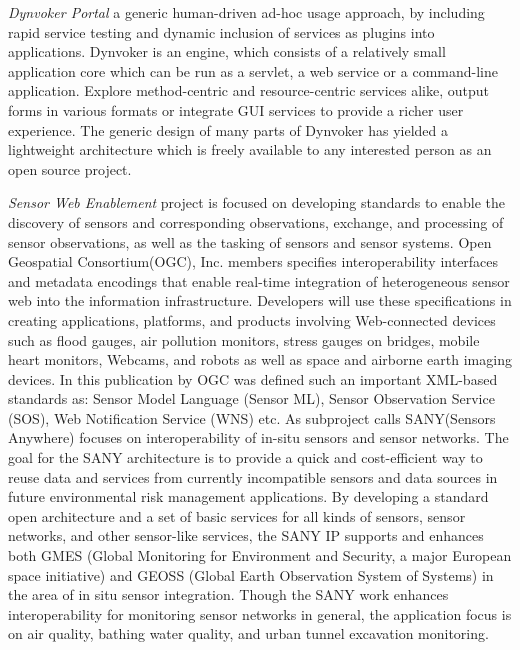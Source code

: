 	\emph{Dynvoker Portal}\cite{spillner2008ad} a generic human-driven ad-hoc usage approach, by including rapid service testing and dynamic inclusion of services as plugins into applications. Dynvoker is an engine, which consists of a relatively small application core which can be run as a servlet, a web service or a command-line application. Explore method-centric and resource-centric services alike, output forms in various formats or integrate GUI services to provide a richer user experience. The generic design of many parts of Dynvoker has yielded a lightweight architecture which is freely available to any interested person as an open source project.

	\emph{Sensor Web Enablement} project\cite{ogc} is focused on developing standards to enable the discovery of sensors and corresponding observations, exchange, and processing of sensor observations, as well as the tasking of sensors and sensor systems. Open Geospatial Consortium(OGC), Inc. members specifies interoperability interfaces and metadata encodings that enable real-time integration of heterogeneous sensor web into the information infrastructure. Developers will use these specifications in creating applications, platforms, and products involving Web-connected devices such as flood gauges, air pollution monitors, stress gauges on bridges, mobile heart monitors, Webcams, and robots as well as space and airborne earth imaging devices. In this publication by OGC was defined such an important XML-based standards as: Sensor Model Language (Sensor ML), Sensor Observation Service (SOS), Web Notification Service (WNS) etc. As subproject calls SANY(Sensors Anywhere) focuses on interoperability of in-situ sensors and sensor networks. The goal for the SANY architecture is to provide a quick and cost-efficient way to reuse data and services from currently incompatible sensors and data sources in future environmental risk management applications. By developing a standard open architecture and a set of basic services for all kinds of sensors, sensor networks, and other sensor-like services, the SANY IP supports and enhances both GMES (Global Monitoring for Environment and Security, a major European space initiative) and GEOSS (Global Earth Observation System of Systems) in the area of in situ sensor integration. Though the SANY work enhances interoperability for monitoring sensor networks in general, the application focus is on air quality, bathing water quality, and urban tunnel excavation monitoring.
 
